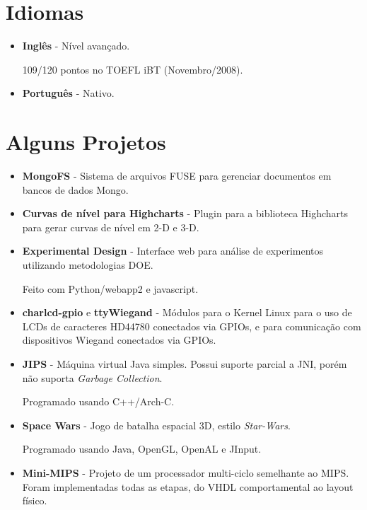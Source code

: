 \documentclass[a4paper,10pt]{article}
\begin{document}
  \section{Idiomas}
    \begin{itemize}
      \item  
        \textbf{Inglês} - Nível avançado.

        109/120 pontos no TOEFL iBT (Novembro/2008).

      \item  
        \textbf{Português} - Nativo.
    \end{itemize}


  \section{Alguns Projetos}
    \begin{itemize}
      \item 
        \textbf{MongoFS} - Sistema de arquivos FUSE para gerenciar documentos em bancos de dados Mongo.

      \item 
        \textbf{Curvas de nível para Highcharts} - Plugin para a biblioteca Highcharts para gerar curvas de nível em 2-D e 3-D.
      
      \item 
        \textbf{Experimental Design} - Interface web para análise de experimentos utilizando metodologias DOE.

        Feito com Python/webapp2 e javascript.
        
      \item 
        \textbf{charlcd-gpio} e \textbf{ttyWiegand} - Módulos para o Kernel Linux para o uso de LCDs de caracteres HD44780 conectados via GPIOs, e para comunicação com dispositivos Wiegand conectados via GPIOs.

      \item 
        \textbf{JIPS} - Máquina virtual Java simples. Possui suporte parcial a JNI, porém não suporta \emph{Garbage Collection}.

        Programado usando C++/Arch-C.

      \item 
        \textbf{Space Wars} - Jogo de batalha espacial 3D, estilo \emph{Star-Wars}.

        Programado usando Java, OpenGL, OpenAL e JInput.

      \item 
        \textbf{Mini-MIPS} - Projeto de um processador multi-ciclo semelhante ao MIPS. Foram implementadas todas as etapas, do VHDL comportamental ao layout físico.


\end{itemize}
\end{document}
